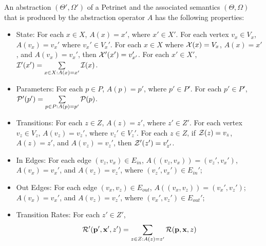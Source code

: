 \begin{definition}
    An abstraction $(\Theta', \Omega')$ of a Petrinet and the associated
    semantics $(\Theta, \Omega)$ that is produced by the abstraction operator
    $A$ has the following properties:
    \begin{itemize}
        \item State: For each $x \in X$,  $A(x) = x'$, where $x' \in
        X'$.  For each vertex $v_x \in V_x$,  $A(v_x) = v_x'$ where $v_x' \in
        V_x'$.   For each $x\in X$ where  ${\cal X}(x) =
        V_x$, $A(x) = x'$, and $A(v_x) = v_x'$, then ${\cal X}'(x')=
        v_{x'}'$.  For each $x' \in X'$, ${\cal I}'(x') = \sum\limits_{x \in X: A(x) = x'} {\cal I}(x)$.
        \item Parameters: For each $p \in P$, $A(p) = p'$, where $p'\in P'$.
        For each $p' \in P'$, ${\cal P}'(p') = \sum\limits_{p \in P: A(p) = p'} {\cal P}(p)$.
        \item Transitions: For each $z \in Z$, $A(z) = z'$, where $z' \in Z'$.
        For each vertex $v_z \in V_z$, $A(v_z) = v_z'$, where $v_z' \in V_z'$.
        For each $z \in Z$, if ${\cal
        Z}(z) = v_z$, $A(z) = z'$, and $A(v_z) = v_z'$, then ${\cal
        Z}'(z') = v_{z'}'$. 
        \item In Edges: For each edge $(v_z, v_x) \in E_{in}$, $A((v_z, v_x)) =
        (v_z', v_x')$, $A(v_x) = v_x'$, and $A(v_z) = v_z'$, where $(v_z',
        v_x')\in E_{in}'$;
        \item Out Edges: For each edge $(v_x, v_z) \in E_{out}$, $A((v_x, v_z))
        = (v_x', v_z')$; $A(v_x) = v_x'$, and $A(v_z) = v_z'$, where $(v_x',
        v_z')\in E_{out}'$;

        
        \item Transition Rates: For each $z' \in Z'$, 
        \begin{equation}\label{eqn:agg-flow}
            {\cal R}'({\bf p}', {\bf
        x}', z') = \sum\limits_{z \in Z: A(z)=z'} {\cal R}({\bf p}, {\bf
        x}, z)
    \end{equation}
    \end{itemize}
\end{definition}

